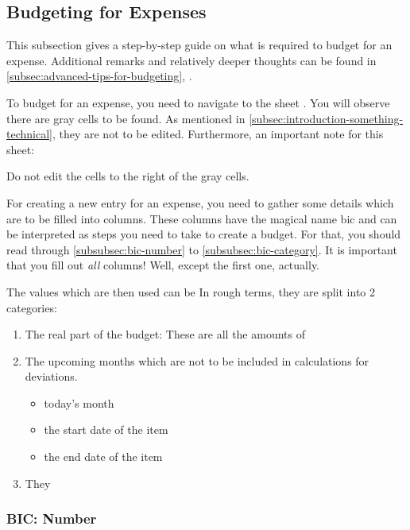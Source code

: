 \subsection{Budgeting for Expenses}
\label{subsec:budgeting-expenses}

This subsection gives a step-by-step guide on what is required to budget for an expense.
Additional remarks and relatively deeper thoughts can be found in \autoref{subsec:advanced-tips-for-budgeting}, .

To budget for an expense, you need to navigate to the sheet .
You will observe there are gray cells to be found.
As mentioned in \autoref{subsec:introduction-something-technical}, they are not to be edited.
Furthermore, an important note for this sheet:
\begin{specialnote}
	Do not edit the cells to the right of the gray cells.
\end{specialnote}

For creating a new entry for an expense, you need to gather some details which are to be filled into columns.
These columns have the magical name \ac{bic} and can be interpreted as steps you need to take to create a budget.
For that, you should read through \autoref{subsubsec:bic-number} to \autoref{subsubsec:bic-category}.
It is important that you fill out \emph{all} columns!
Well, except the first one, actually.

The values which are then used can be In rough terms, they are split into 2 categories:
\begin{enumerate}
	\item The real part of the budget:
	These are all the amounts of 
	\item The upcoming months which are not to be included in calculations for deviations.
	\begin{itemize}
		\item today's month
		\item the start date of the item
		\item the end date of the item
	\end{itemize}
	
	\item They
\end{enumerate}

\subsubsection{BIC: Number}
\label{subsubsec:bic-number}

